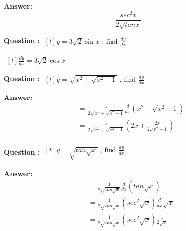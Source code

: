 \documentclass{beamer}
\begin{document}

\frame
{
\textbf{Answer:}
\begin{equation} \nonumber
\frac{sec^2x}{2\sqrt{tan x}}
\end{equation}

}




\frame
{
\textbf{Question :} 
$\begin{aligned}[t] 
y= 3\sqrt{2}\sin x  \text{\ , \  \ find \ \  } \frac{dy}{dx}
\end{aligned}$
}


\frame
{
$\begin{aligned}[t] 
 \frac{dy}{dx}= 3\sqrt{2}\cos x 
\end{aligned}$

}


\frame
{
\textbf{Question :} 
$\begin{aligned}[t] 
y= \sqrt{x^2 + \sqrt{x^2 +1}}  \text{\ , \  \ find \ \  } \frac{dy}{dx}
\end{aligned}$
}

\large
\frame
{
\textbf{Answer:}
\begin{align*} \nonumber
&= \frac{1}{2\sqrt{x^2 + \sqrt{x^2 +1}}} \frac{d }{dx}\left( {x^2 + \sqrt{x^2 +1}} \right) \\
&= \frac{1}{2\sqrt{x^2 + \sqrt{x^2 +1}}} \left( {2x + \frac{2x}{2\sqrt{x^2 +1}}} \right) \\
\end{align*}

}



\frame
{
\textbf{Question :} 
$\begin{aligned}[t] 
y= \sqrt{tan \sqrt{x} }  \text{\ , \  \ find \ \  } \frac{dy}{dx}
\end{aligned}$
}


\Large
\frame
{
\textbf{Answer:}
\begin{align*} \nonumber
&= \frac{1}{2\sqrt{tan \sqrt{x}}} \frac{d }{dx}\left( {tan \sqrt{x}} \right) \\
&= \frac{1}{2\sqrt{tan \sqrt{x}}} \left( {sec^2\sqrt{x}} \right)\frac{d }{dx}\sqrt{x} \\
&= \frac{1}{2\sqrt{tan \sqrt{x}}}\left( {sec^2\sqrt{x}}\right)\frac{1}{2\sqrt{x}}
\end{align*}
}
\end{document}
